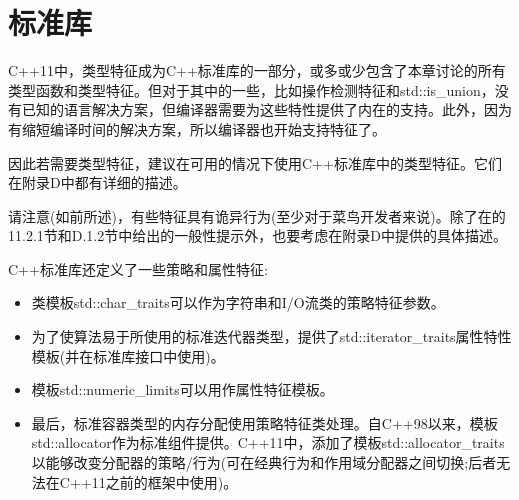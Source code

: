 \section{标准库}
C++11中，类型特征成为C++标准库的一部分，或多或少包含了本章讨论的所有类型函数和类型特征。但对于其中的一些，比如操作检测特征和std::is\_union，没有已知的语言解决方案，但编译器需要为这些特性提供了内在的支持。此外，因为有缩短编译时间的解决方案，所以编译器也开始支持特征了。

因此若需要类型特征，建议在可用的情况下使用C++标准库中的类型特征。它们在附录D中都有详细的描述。

请注意(如前所述)，有些特征具有诡异行为(至少对于菜鸟开发者来说)。除了在的11.2.1节和D.1.2节中给出的一般性提示外，也要考虑在附录D中提供的具体描述。

C++标准库还定义了一些策略和属性特征:

\begin{itemize}
\item 
类模板std::char\_traits可以作为字符串和I/O流类的策略特征参数。

\item 
为了使算法易于所使用的标准迭代器类型，提供了std::iterator\_traits属性特性模板(并在标准库接口中使用)。

\item 
模板std::numeric\_limits可以用作属性特征模板。

\item 
最后，标准容器类型的内存分配使用策略特征类处理。自C++98以来，模板std::allocator作为标准组件提供。C++11中，添加了模板std::allocator\_traits以能够改变分配器的策略/行为(可在经典行为和作用域分配器之间切换;后者无法在C++11之前的框架中使用)。
\end{itemize}



































